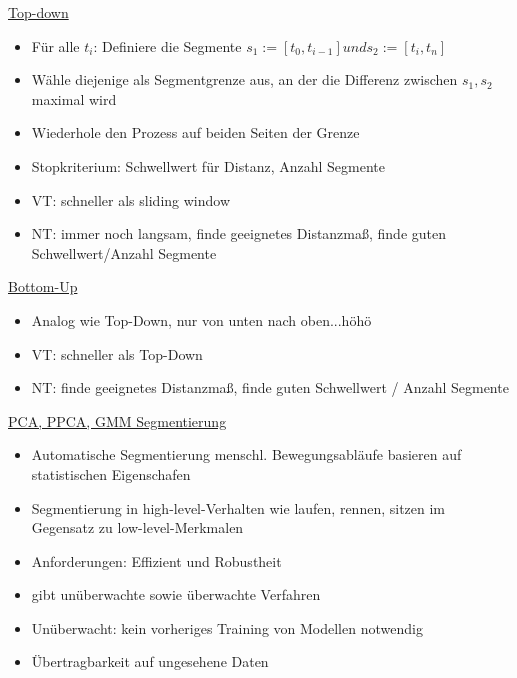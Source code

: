 \documentclass[a4paper,10pt,oneside]{article}
\begin{document}
\underline{Top-down} \\
 	\begin{itemize}
 		\item Für alle $t_i$: Definiere die Segmente $s_1 := [t_0,t_{i-1}] und s_2 := [t_i,t_n]$
 		\item Wähle diejenige als Segmentgrenze aus, an der die Differenz zwischen $s_1,s_2$ maximal wird
 		\item Wiederhole den Prozess auf beiden Seiten der Grenze
 		\item Stopkriterium: Schwellwert für Distanz, Anzahl Segmente
 		\item VT: schneller als sliding window
 		\item NT: immer noch langsam, finde geeignetes Distanzmaß, finde guten Schwellwert/Anzahl Segmente
 	\end{itemize}
 		
\underline{Bottom-Up} \\
 	\begin{itemize}
 		\item Analog wie Top-Down, nur von unten nach oben...höhö
 		\item VT: schneller als Top-Down
 		\item NT: finde geeignetes Distanzmaß, finde guten Schwellwert / Anzahl Segmente
 	\end{itemize}
 	
\underline{PCA, PPCA, GMM Segmentierung} \\
 	\begin{itemize}
 		\item Automatische Segmentierung menschl. Bewegungsabläufe basieren auf statistischen Eigenschafen
 		\item Segmentierung in high-level-Verhalten wie laufen, rennen, sitzen im Gegensatz zu low-level-Merkmalen 
 		\item Anforderungen: Effizient und Robustheit
 		\item gibt unüberwachte sowie überwachte Verfahren
 		\item Unüberwacht: kein vorheriges Training von Modellen notwendig
 		\item Übertragbarkeit auf ungesehene Daten
 	\end{itemize}
 
\end{document}
